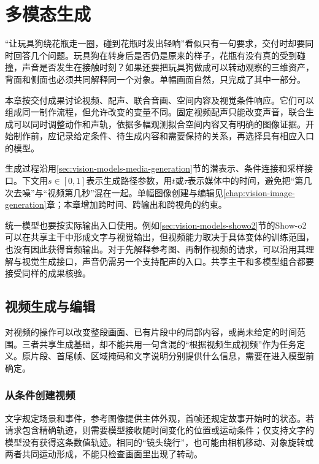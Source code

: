 \chapter{多模态生成}
\label{chap:vision-multimodal-generation}

“让玩具狗绕花瓶走一圈，碰到花瓶时发出轻响”看似只有一句要求，交付时却要同时回答几个问题。玩具狗在转身后是否仍是原来的样子，花瓶有没有真的受到碰撞，声音是否发生在接触时刻？如果还要把玩具狗做成可以转动观察的三维资产，背面和侧面也必须共同解释同一个对象。单幅画面自然，只完成了其中一部分。

本章按交付成果讨论视频、配声、联合音画、空间内容及视觉条件响应。它们可以组成同一制作流程，但允许改变的变量不同。固定视频配声只能改变声音，联合生成可以同时调整动作和声轨，依据多幅观测拟合空间内容又有明确的图像证据。开始制作前，应记录给定条件、待生成内容和需要保持的关系，再选择具有相应入口的模型。

生成过程沿用\ref{sec:vision-models-media-generation}节的潜表示、条件连接和采样接口。下文用$s\in[0,1]$表示生成路径参数，用$t$或$\tau$表示媒体中的时间，避免把“第几次去噪”与“视频第几秒”混在一起。单幅图像创建与编辑见\ref{chap:vision-image-generation}章；本章增加跨时间、跨输出和跨视角的约束。

统一模型也要按实际输出入口使用。例如\ref{sec:vision-models-showo2}节的Show-o2可以在共享主干中形成文字与视觉输出，但视频能力取决于具体变体的训练范围，也没有因此获得音频输出。对于先解释参考图、再制作视频的请求，可以沿用其理解与视觉生成接口，声音仍需另一个支持配声的入口。共享主干和多模型组合都要接受同样的成果核验。

\section{视频生成与编辑}
\label{sec:vision-multigen-video}

对视频的操作可以改变整段画面、已有片段中的局部内容，或尚未给定的时间范围。三者共享生成基础，却不能共用一句含混的“根据视频生成视频”作为任务定义。原片段、首尾帧、区域掩码和文字说明分别提供什么信息，需要在进入模型前确定。

\subsection{从条件创建视频}
\label{sec:vision-multigen-create-video}

文字规定场景和事件，参考图像提供主体外观，首帧还规定故事开始时的状态。若请求包含精确轨迹，则需要模型接收随时间变化的位置或运动条件；仅支持文字的模型没有获得这条数值轨迹。相同的“镜头绕行”，也可能由相机移动、对象旋转或两者共同运动形成，不能只检查画面里出现了转动。

